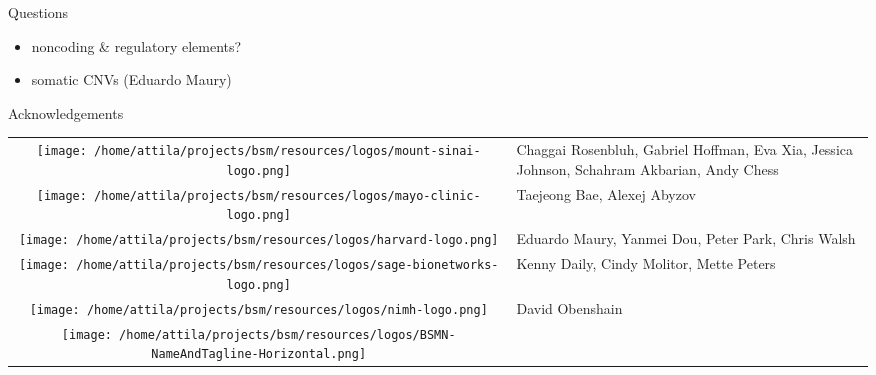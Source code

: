 \documentclass[usenames,dvipsnames]{beamer}
\begin{document}
\begin{frame}{Questions}
\begin{itemize}
\item noncoding \& regulatory elements?
\item somatic CNVs (Eduardo Maury)
\end{itemize}
\end{frame}

\begin{frame}{Acknowledgements}
\footnotesize
\begin{tabular}{cp{3in}}
\parbox[c]{9em}{\texttt{[image: /home/attila/projects/bsm/resources/logos/mount-sinai-logo.png]}}
& Chaggai Rosenbluh, Gabriel Hoffman, Eva Xia, Jessica Johnson, Schahram Akbarian, Andy Chess \\
\noalign{\medskip}
\parbox[c]{9em}{\texttt{[image: /home/attila/projects/bsm/resources/logos/mayo-clinic-logo.png]}} & Taejeong Bae, Alexej Abyzov \\
\noalign{\medskip}
\parbox[c]{9em}{\texttt{[image: /home/attila/projects/bsm/resources/logos/harvard-logo.png]}}
& Eduardo Maury, Yanmei Dou, Peter Park, Chris Walsh \\
\noalign{\medskip}
\parbox[c]{9em}{\texttt{[image: /home/attila/projects/bsm/resources/logos/sage-bionetworks-logo.png]}} & Kenny Daily, Cindy Molitor, Mette Peters \\
\noalign{\medskip}
\parbox[c]{9em}{\texttt{[image: /home/attila/projects/bsm/resources/logos/nimh-logo.png]}}
& David Obenshain \\
\noalign{\medskip}
\parbox[c]{9em}{\texttt{[image: /home/attila/projects/bsm/resources/logos/BSMN-NameAndTagline-Horizontal.png]}}
& \\
\end{tabular}
\end{frame}
\end{document}
